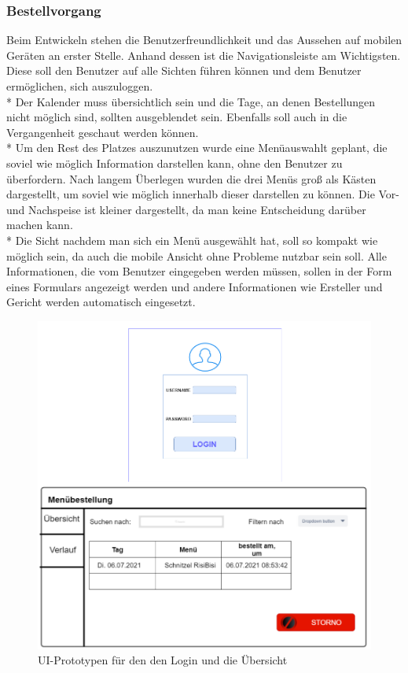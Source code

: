 \subsubsection{Bestellvorgang}
Beim Entwickeln stehen die Benutzerfreundlichkeit und das Aussehen auf mobilen Geräten an erster Stelle. Anhand dessen ist die Navigationsleiste am Wichtigsten.
Diese soll den Benutzer auf alle Sichten führen können und dem Benutzer ermöglichen, sich auszuloggen. \\*
Der Kalender muss übersichtlich sein und die Tage, an denen Bestellungen nicht möglich sind, sollten ausgeblendet sein. Ebenfalls soll auch in die Vergangenheit geschaut werden können.\\*
Um den Rest des Platzes auszunutzen wurde eine Menüauswahlt geplant, die soviel wie möglich Information darstellen kann, ohne den Benutzer zu überfordern.
Nach langem Überlegen wurden die drei Menüs groß als Kästen dargestellt, um soviel wie möglich innerhalb dieser darstellen zu können.
Die Vor- und Nachspeise ist kleiner dargestellt, da man keine Entscheidung darüber machen kann.\\*
Die Sicht nachdem man sich ein Menü ausgewählt hat, soll so kompakt wie möglich sein, da auch die mobile Ansicht ohne Probleme nutzbar sein soll.
Alle Informationen, die vom Benutzer eingegeben werden müssen, sollen in der Form eines Formulars angezeigt werden und andere Informationen wie Ersteller und Gericht 
werden automatisch eingesetzt.
\begin{figure}[htp]
    \author{Benjamin Besic}
    \centering
    \includegraphics[scale=0.36]{pics/UI-Login-Uebersicht-Prototyp.png}
    \caption{UI-Prototypen für den den Login und die Übersicht}
    \label{fig:impl:UIPlanningLogUebersicht}
\end{figure}


